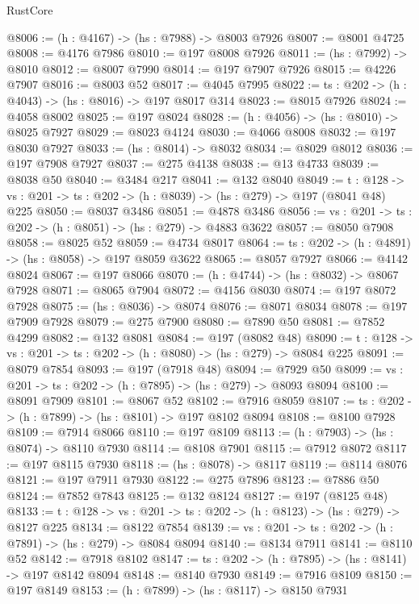 \begin{lexlean}{RustCore}
\begin{coremodule}
@8006 := (h : @4167) -> (hs : @7988) -> @8003 @7926
@8007 := @8001 @4725
@8008 := @4176 @7986
@8010 := @197 @8008 @7926
@8011 := (hs : @7992) -> @8010
@8012 := @8007 @7990
@8014 := @197 @7907 @7926
@8015 := @4226 @7907
@8016 := @8003 @52
@8017 := @4045 @7995
@8022 := {ts : @202} -> (h : @4043) -> (hs : @8016) -> @197 @8017 @314
@8023 := @8015 @7926
@8024 := @4058 @8002
@8025 := @197 @8024
@8028 := (h : @4056) -> (hs : @8010) -> @8025 @7927
@8029 := @8023 @4124
@8030 := @4066 @8008
@8032 := @197 @8030 @7927
@8033 := (hs : @8014) -> @8032
@8034 := @8029 @8012
@8036 := @197 @7908 @7927
@8037 := @275 @4138
@8038 := @13 @4733
@8039 := @8038 @50
@8040 := @3484 @217
@8041 := @132 @8040
@8049 := {t : @128} ->
  {vs : @201} -> {ts : @202} -> (h : @8039) -> (hs : @279) -> @197 (@8041 @48) @225
@8050 := @8037 @3486
@8051 := @4878 @3486
@8056 := {vs : @201} -> {ts : @202} -> (h : @8051) -> (hs : @279) -> @4883 @3622
@8057 := @8050 @7908
@8058 := @8025 @52
@8059 := @4734 @8017
@8064 := {ts : @202} -> (h : @4891) -> (hs : @8058) -> @197 @8059 @3622
@8065 := @8057 @7927
@8066 := @4142 @8024
@8067 := @197 @8066
@8070 := (h : @4744) -> (hs : @8032) -> @8067 @7928
@8071 := @8065 @7904
@8072 := @4156 @8030
@8074 := @197 @8072 @7928
@8075 := (hs : @8036) -> @8074
@8076 := @8071 @8034
@8078 := @197 @7909 @7928
@8079 := @275 @7900
@8080 := @7890 @50
@8081 := @7852 @4299
@8082 := @132 @8081
@8084 := @197 (@8082 @48)
@8090 := {t : @128} -> {vs : @201} -> {ts : @202} -> (h : @8080) -> (hs : @279) -> @8084 @225
@8091 := @8079 @7854
@8093 := @197 (@7918 @48)
@8094 := @7929 @50
@8099 := {vs : @201} -> {ts : @202} -> (h : @7895) -> (hs : @279) -> @8093 @8094
@8100 := @8091 @7909
@8101 := @8067 @52
@8102 := @7916 @8059
@8107 := {ts : @202} -> (h : @7899) -> (hs : @8101) -> @197 @8102 @8094
@8108 := @8100 @7928
@8109 := @7914 @8066
@8110 := @197 @8109
@8113 := (h : @7903) -> (hs : @8074) -> @8110 @7930
@8114 := @8108 @7901
@8115 := @7912 @8072
@8117 := @197 @8115 @7930
@8118 := (hs : @8078) -> @8117
@8119 := @8114 @8076
@8121 := @197 @7911 @7930
@8122 := @275 @7896
@8123 := @7886 @50
@8124 := @7852 @7843
@8125 := @132 @8124
@8127 := @197 (@8125 @48)
@8133 := {t : @128} -> {vs : @201} -> {ts : @202} -> (h : @8123) -> (hs : @279) -> @8127 @225
@8134 := @8122 @7854
@8139 := {vs : @201} -> {ts : @202} -> (h : @7891) -> (hs : @279) -> @8084 @8094
@8140 := @8134 @7911
@8141 := @8110 @52
@8142 := @7918 @8102
@8147 := {ts : @202} -> (h : @7895) -> (hs : @8141) -> @197 @8142 @8094
@8148 := @8140 @7930
@8149 := @7916 @8109
@8150 := @197 @8149
@8153 := (h : @7899) -> (hs : @8117) -> @8150 @7931

\end{coremodule}
\end{lexlean}
